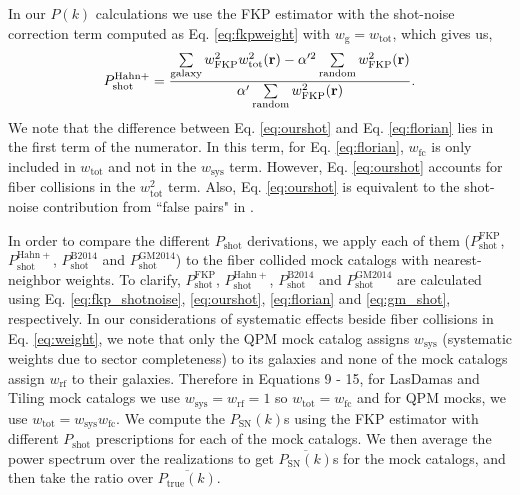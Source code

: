 \documentclass{emulateapj}
\begin{document}
In our $P(k)$ calculations we use the FKP estimator with the shot-noise correction term computed as Eq. \ref{eq:fkpweight} with $w_\mathrm{g} = w_\mathrm{tot}$, which gives us, 
\begin{equation} \label{eq:ourshot}
P^\mathrm{Hahn+}_\mathrm{shot} = \frac{\sum\limits_{\mathrm{galaxy}} w^2_\mathrm{FKP}w^2_\mathrm{tot}({\bf r}) - \alpha'^2 \sum\limits_{\mathrm{random}} w_\mathrm{FKP}^2({\bf r})}{\alpha' \sum\limits_{\mathrm{random}}w_\mathrm{FKP}^2({\bf r})}.
\end{equation}
We note that the difference between Eq. \ref{eq:ourshot} and Eq. \ref{eq:florian} lies in the first term of the numerator. In this term, for Eq. \ref{eq:florian}, $w_\mathrm{fc}$ is only included in $w_\mathrm{tot}$ and not in the $w_\mathrm{sys}$ term. However, Eq. \ref{eq:ourshot} accounts for fiber collisions in the $w_\mathrm{tot}^2$ term. Also, Eq. \ref{eq:ourshot} is equivalent to the shot-noise contribution from ``false pairs" in \cite{Gil-Marin:2014aa}. 

In order to compare the different $P_\mathrm{shot}$ derivations, we apply each of them ($P^\mathrm{FKP}_\mathrm{shot}$, $P^\mathrm{Hahn+}_\mathrm{shot}$, $P^\mathrm{B2014}_\mathrm{shot}$ and $P^\mathrm{GM2014}_\mathrm{shot}$) to the fiber collided mock catalogs with nearest-neighbor weights. To clarify, $P^\mathrm{FKP}_\mathrm{shot}$, $P^\mathrm{Hahn+}_\mathrm{shot}$, $P^\mathrm{B2014}_\mathrm{shot}$ and $P^\mathrm{GM2014}_\mathrm{shot}$ are calculated using Eq. \ref{eq:fkp_shotnoise}, \ref{eq:ourshot}, \ref{eq:florian} and \ref{eq:gm_shot}, respectively. In our considerations of systematic effects beside fiber collisions in Eq. \ref{eq:weight}, we note that only the QPM mock catalog assigns $w_\mathrm{sys}$ (systematic weights due to sector completeness) to its galaxies and none of the mock catalogs assign $w_\mathrm{rf}$ to their galaxies. Therefore in Equations 9 - 15, for LasDamas and Tiling mock catalogs we use $w_\mathrm{sys} = w_\mathrm{rf} = 1$ so $w_\mathrm{tot} = w_\mathrm{fc}$ and for QPM mocks, we use $w_\mathrm{tot} = w_\mathrm{sys} w_\mathrm{fc}$. We compute the $P_\mathrm{SN}(k)$s using the FKP estimator with different $P_\mathrm{shot}$ prescriptions for each of the mock catalogs. We then average the power spectrum over the realizations to get $\overline{P_\mathrm{SN}(k)}$s for the mock catalogs, and then take the ratio over $\overline{P_\mathrm{true}(k)}$. 
\end{document}
